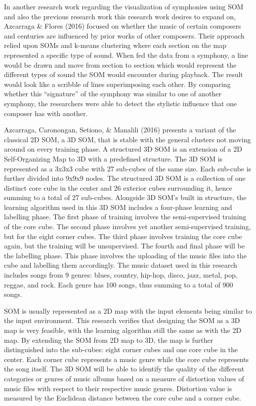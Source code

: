 In another research work regarding the visualization of symphonies using SOM and also the previous research work this research work desires to expand on, Azcarraga \& Flores (2016) focused on whether the music of certain composers and centuries are influenced by prior works of other composers. Their approach relied upon SOMs and k-means clustering where each section on the map represented a specific type of sound. When fed the data from a symphony, a line would be drawn and move from section to section which would represent the different types of sound the SOM would encounter during playback. The result would look like a scribble of lines superimposing each other. By comparing whether this “signature” of the symphony was similar to one of another symphony, the researchers were able to detect the stylistic influence that one composer has with another.

	Azcarraga, Caronongan, Setiono, \& Manalili (2016) presents a variant of the classical 2D SOM, a 3D SOM, that is stable with the general clusters not moving around on every training phase. A structured 3D SOM is an extension of a 2D Self-Organizing Map to 3D with a predefined structure. The 3D SOM is represented as a 3x3x3 cube with 27 sub-cubes of the same size. Each sub-cube is further divided into 9x9x9 nodes. The structured 3D SOM is a collection of one distinct core cube in the center and 26 exterior cubes surrounding it, hence summing to a total of 27 sub-cubes. Alongside 3D SOM’s built in structure, the learning algorithm used in this 3D SOM includes a four-phase learning and labelling phase. The first phase of training involves the semi-supervised training of the core cube. The second phase involves yet another semi-supervised training, but for the eight corner cubes. The third phase involves training the core cube again, but the training will be unsupervised. The fourth and final phase will be the labelling phase. This phase involves the uploading of the music files into the cube and labelling them accordingly. The music dataset used in this research includes songs from 9 genres: blues, country, hip-hop, disco, jazz, metal, pop, reggae, and rock. Each genre has 100 songs, thus summing to a total of 900 songs.

	SOM is usually represented as a 2D map with the input elements being similar to the input environment. This research verifies that designing the SOM as a 3D map is very feasible, with the learning algorithm still the same as with the 2D map. By extending the SOM from 2D map to 3D, the map is further distinguished into the sub-cubes: eight corner cubes and one core cube in the center. Each corner cube represents a music genre while the core cube represents the song itself. The 3D SOM will be able to identify the quality of the different categories or genres of music albums based on a measure of distortion values of music files with respect to their respective music genres. Distortion value is measured by the Euclidean distance between the core cube and a corner cube.

